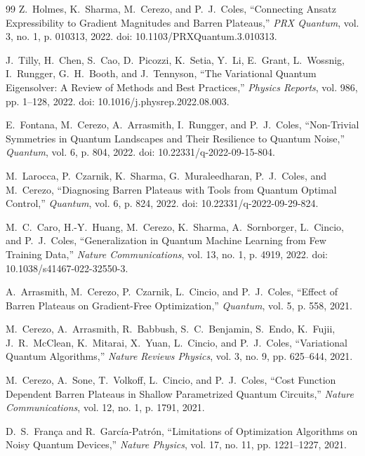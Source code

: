 \documentclass[journal]{IEEEtran}
\begin{document}
\begin{thebibliography}{99}
Z.~Holmes, K.~Sharma, M.~Cerezo, and P.~J.~Coles,
``Connecting Ansatz Expressibility to Gradient Magnitudes and Barren Plateaus,''
\emph{PRX Quantum}, vol. 3, no. 1, p. 010313, 2022.
doi: 10.1103/PRXQuantum.3.010313.

J.~Tilly, H.~Chen, S.~Cao, D.~Picozzi, K.~Setia, Y.~Li,
E.~Grant, L.~Wossnig, I.~Rungger, G.~H.~Booth, and J.~Tennyson,
``The Variational Quantum Eigensolver: A Review of Methods and Best Practices,''
\emph{Physics Reports}, vol. 986, pp. 1--128, 2022.
doi: 10.1016/j.physrep.2022.08.003.

E.~Fontana, M.~Cerezo, A.~Arrasmith, I.~Rungger, and P.~J.~Coles,
``Non-Trivial Symmetries in Quantum Landscapes and Their Resilience to Quantum Noise,''
\emph{Quantum}, vol. 6, p. 804, 2022.
doi: 10.22331/q-2022-09-15-804.

M.~Larocca, P.~Czarnik, K.~Sharma, G.~Muraleedharan,
P.~J.~Coles, and M.~Cerezo,
``Diagnosing Barren Plateaus with Tools from Quantum Optimal Control,''
\emph{Quantum}, vol. 6, p. 824, 2022.
doi: 10.22331/q-2022-09-29-824.

M.~C.~Caro, H.-Y.~Huang, M.~Cerezo, K.~Sharma, A.~Sornborger,
L.~Cincio, and P.~J.~Coles,
``Generalization in Quantum Machine Learning from Few Training Data,''
\emph{Nature Communications}, vol. 13, no. 1, p. 4919, 2022.
doi: 10.1038/s41467-022-32550-3.

A.~Arrasmith, M.~Cerezo, P.~Czarnik, L.~Cincio, and P.~J.~Coles,
``Effect of Barren Plateaus on Gradient-Free Optimization,''
\emph{Quantum}, vol. 5, p. 558, 2021.

M.~Cerezo, A.~Arrasmith, R.~Babbush, S.~C.~Benjamin, S.~Endo,
K.~Fujii, J.~R.~McClean, K.~Mitarai, X.~Yuan, L.~Cincio,
and P.~J.~Coles,
``Variational Quantum Algorithms,''
\emph{Nature Reviews Physics}, vol. 3, no. 9,
pp. 625--644, 2021.

M.~Cerezo, A.~Sone, T.~Volkoff, L.~Cincio, and P.~J.~Coles,
``Cost Function Dependent Barren Plateaus in Shallow Parametrized Quantum Circuits,''
\emph{Nature Communications}, vol. 12, no. 1, p. 1791, 2021.

D.~S.~Fran{\c{c}}a and R.~Garc{\'i}a-Patr{\'o}n,
``Limitations of Optimization Algorithms on Noisy Quantum Devices,''
\emph{Nature Physics}, vol. 17, no. 11,
pp. 1221--1227, 2021.


\end{thebibliography}
\end{document}
